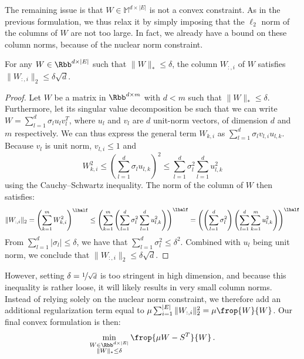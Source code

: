 The remaining issue is that $W\in \mathbb{M}^{d\times |E|}$ is not a convex constraint. As in the
previous formulation, we thus relax it by simply imposing that the $\ell_2$ norm of the columns of
$W$ are not too large. In fact, we already have a bound on these column norms, because of the
nuclear norm constraint.
\begin{prop}
For any $W\in \Rbb^{d\times |E|}$ such that $\|W\|_* \leq \delta$, the \ith{} column $W_{:,i}$ of
$W$ satisfies $\|W_{:,i}\|_2 \leq \delta\sqrt{d}$.
\end{prop}
\begin{proof}
  Let $W$ be a matrix in $\Rbb^{d\times m}$ with $d < m$ such that $\|W\|_* \leq \delta$.
  Furthermore, let its singular value decomposition be such that we can write $W = \sum_{l=1}^d
  \sigma_l u_l v_l^T$, where $u_l$ and $v_l$ are $d$ unit-norm vectors, of dimension $d$ and $m$
  respectively. We can thus express the general term $W_{k,i}$ as $\sum_{l=1}^d \sigma_l v_{l,i}
  u_{l,k}$. Because $v_l$ is unit norm, $v_{l,i} \leq 1$ and $$W_{k,i}^2 \leq \left( \sum_{l=1}^d
  \sigma_l u_{l,k} \right)^2 \leq \sum_{l=1}^d \sigma_l^2 \sum_{l=1}^d u_{l,k}^2$$ using the
  Cauchy--Schwartz inequality. The norm of the \ith{} column of $W$ then satisfies:
  \begin{equation*}
    \|W_{:,i}\|_2 = \left( \sum_{k=1}^m W_{k,i}^2 \right)^\lhalf
    \leq \left( \sum_{k=1}^m \left( \sum_{l=1}^d \sigma_l^2 \sum_{l=1}^d u_{l,k}^2 \right) \right)^\lhalf
    = \left( \left( \sum_{l=1}^d \sigma_l^2 \right) \left( \sum_{l=1}^d \sum_{k=1}^m u_{l,k}^2 \right) \right)^\lhalf
  \end{equation*}
  From $\sum_{l=1}^d |\sigma_l | \leq \delta$, we have that $\sum_{l=1}^d \sigma_l^2 \leq \delta^2$.
  Combined with $u_l$ being unit norm, we conclude that $\|W_{:,i}\|_2 \leq \delta\sqrt{d}$.
\end{proof}
However, setting $\delta = \nicefrac{1}{\sqrt{d}}$ is too stringent in high dimension, and because
this inequality is rather loose, it will likely results in very small column norms. Instead of
relying solely on the nuclear norm constraint, we therefore add an additional regularization term
equal to $\mu \sum_{i=1}^{|E|} \|W_{:,i}\|_2^2 = \mu \frop{W}{W}$. Our final convex formulation is
then:
\begin{equation}
  \label{eq:edge_FW}
  \min_{\substack{W\in \Rbb^{d\times |E|} \\ \|W\|_* \leq \delta}} \frop{\mu W - S^T}{W} \,.
\end{equation}

